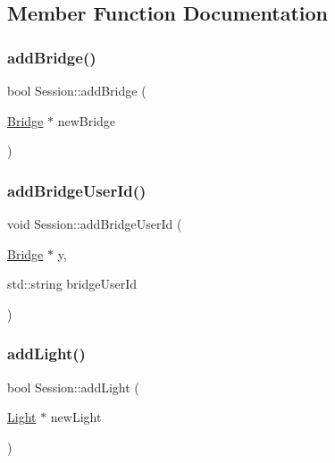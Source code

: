 \subsection{Member Function Documentation}
\mbox{\label{class_session_af578feecff75f6eabc70d4110d04b04c}} 
\subsubsection{\texorpdfstring{add\+Bridge()}{addBridge()}}
{\footnotesize\ttfamily bool Session\+::add\+Bridge (\begin{DoxyParamCaption}\item[{\hyperlink{class_bridge}{Bridge} $\ast$}]{new\+Bridge }\end{DoxyParamCaption})}

\mbox{\label{class_session_aeaa52fe80f71a9c299a7fe10a1568568}} 
\subsubsection{\texorpdfstring{add\+Bridge\+User\+Id()}{addBridgeUserId()}}
{\footnotesize\ttfamily void Session\+::add\+Bridge\+User\+Id (\begin{DoxyParamCaption}\item[{\hyperlink{class_bridge}{Bridge} $\ast$}]{y,  }\item[{std\+::string}]{bridge\+User\+Id }\end{DoxyParamCaption})}

\mbox{\label{class_session_a7cbed13dc3a89c26910c09fb32efc279}} 
\subsubsection{\texorpdfstring{add\+Light()}{addLight()}}
{\footnotesize\ttfamily bool Session\+::add\+Light (\begin{DoxyParamCaption}\item[{\hyperlink{class_light}{Light} $\ast$}]{new\+Light }\end{DoxyParamCaption})}

